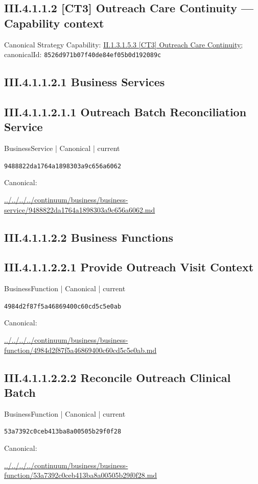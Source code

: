 \documentclass[10pt,a4paper]{article}
\begin{document}
\subsection*{III.4.1.1.2 [CT3] Outreach Care Continuity — Capability context}
Canonical Strategy Capability: \hyperref[element-8526d971b07f40de84ef05b0d192089c]{II.1.3.1.5.3 [CT3] Outreach Care Continuity}; canonicalId: \texttt{8526d971b07f40de84ef05b0d192089c}\par
\subsection*{III.4.1.1.2.1 Business Services}
\subsection*{III.4.1.1.2.1.1 Outreach Batch Reconciliation Service}
\label{element-9488822da1764a1898303a9c656a6062}
{\small BusinessService | Canonical | current}\par
\texttt{9488822da1764a1898303a9c656a6062}\par
Canonical: \par
{\footnotesize\url{../../../../continuum/business/business-service/9488822da1764a1898303a9c656a6062.md}}\par
\subsection*{III.4.1.1.2.2 Business Functions}
\subsection*{III.4.1.1.2.2.1 Provide Outreach Visit Context}
\label{element-4984d2f87f5a46869400c60cd5c5e0ab}
{\small BusinessFunction | Canonical | current}\par
\texttt{4984d2f87f5a46869400c60cd5c5e0ab}\par
Canonical: \par
{\footnotesize\url{../../../../continuum/business/business-function/4984d2f87f5a46869400c60cd5c5e0ab.md}}\par
\subsection*{III.4.1.1.2.2.2 Reconcile Outreach Clinical Batch}
\label{element-53a7392c0ceb413ba8a00505b29f0f28}
{\small BusinessFunction | Canonical | current}\par
\texttt{53a7392c0ceb413ba8a00505b29f0f28}\par
Canonical: \par
{\footnotesize\url{../../../../continuum/business/business-function/53a7392c0ceb413ba8a00505b29f0f28.md}}\par
\end{document}
